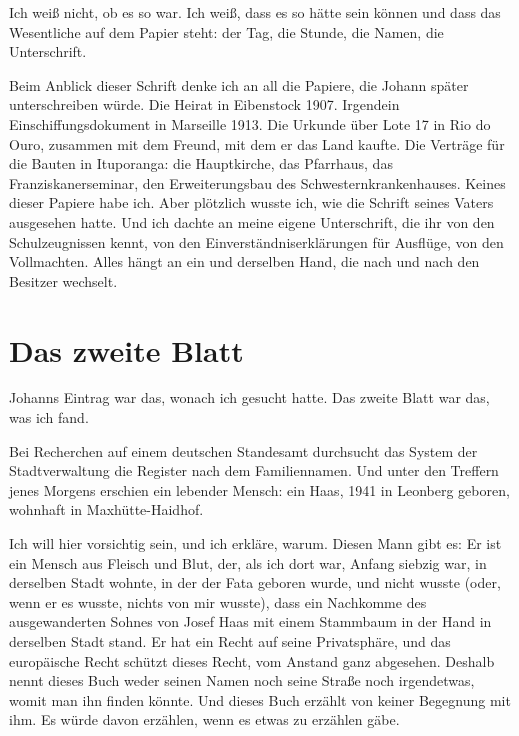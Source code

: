 \documentclass[
  ngerman,
  11pt,
  openany]{book}
\begin{document}
Ich weiß nicht, ob es so war. Ich weiß, dass es so hätte sein können und
dass das Wesentliche auf dem Papier steht: der Tag, die Stunde, die
Namen, die Unterschrift.

Beim Anblick dieser Schrift denke ich an all die Papiere, die Johann
später unterschreiben würde. Die Heirat in Eibenstock 1907. Irgendein
Einschiffungsdokument in Marseille 1913. Die Urkunde über Lote 17 in Rio
do Ouro, zusammen mit dem Freund, mit dem er das Land kaufte. Die
Verträge für die Bauten in Ituporanga: die Hauptkirche, das Pfarrhaus,
das Franziskanerseminar, den Erweiterungsbau des
Schwesternkrankenhauses. Keines dieser Papiere habe ich. Aber plötzlich
wusste ich, wie die Schrift seines Vaters ausgesehen hatte. Und ich
dachte an meine eigene Unterschrift, die ihr von den Schulzeugnissen
kennt, von den Einverständniserklärungen für Ausflüge, von den
Vollmachten. Alles hängt an ein und derselben Hand, die nach und nach
den Besitzer wechselt.

\section{Das zweite Blatt}\label{das-zweite-blatt}

Johanns Eintrag war das, wonach ich gesucht hatte. Das zweite Blatt war
das, was ich fand.

Bei Recherchen auf einem deutschen Standesamt durchsucht das System der
Stadtverwaltung die Register nach dem Familiennamen. Und unter den
Treffern jenes Morgens erschien ein lebender Mensch: ein Haas, 1941 in
Leonberg geboren, wohnhaft in Maxhütte-Haidhof.

Ich will hier vorsichtig sein, und ich erkläre, warum. Diesen Mann gibt
es: Er ist ein Mensch aus Fleisch und Blut, der, als ich dort war,
Anfang siebzig war, in derselben Stadt wohnte, in der der Fata geboren
wurde, und nicht wusste (oder, wenn er es wusste, nichts von mir
wusste), dass ein Nachkomme des ausgewanderten Sohnes von Josef Haas mit
einem Stammbaum in der Hand in derselben Stadt stand. Er hat ein Recht
auf seine Privatsphäre, und das europäische Recht schützt dieses Recht,
vom Anstand ganz abgesehen. Deshalb nennt dieses Buch weder seinen Namen
noch seine Straße noch irgendetwas, womit man ihn finden könnte. Und
dieses Buch erzählt von keiner Begegnung mit ihm. Es würde davon
erzählen, wenn es etwas zu erzählen gäbe.
\end{document}

